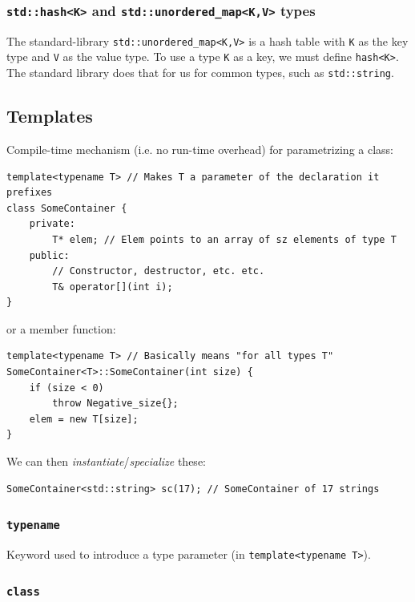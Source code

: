 \documentclass[table, xcdraw]{article}%
\begin{document}
\subsubsection{\texttt{std::hash<K>} and \texttt{std::unordered_map<K,V>} types}

The standard-library \texttt{std::unordered_map<K,V>} is a hash table with \texttt{K} as the key type and \texttt{V} as the value type. To use a type \texttt{K} as a key, we must define \texttt{hash<K>}. The standard library does that for us for common types, such as \texttt{std::string}.

\subsection{Templates}

Compile-time mechanism (i.e. no run-time overhead) for parametrizing a class:

\begin{verbatim}
template<typename T> // Makes T a parameter of the declaration it prefixes
class SomeContainer {
    private:
        T* elem; // Elem points to an array of sz elements of type T
    public:
        // Constructor, destructor, etc. etc.
        T& operator[](int i);
}
\end{verbatim}

or a member function:

\begin{verbatim}
template<typename T> // Basically means "for all types T"
SomeContainer<T>::SomeContainer(int size) {
    if (size < 0)
        throw Negative_size{};
    elem = new T[size];
}
\end{verbatim}

We can then \textit{instantiate}/\textit{specialize} these:

\begin{verbatim}
SomeContainer<std::string> sc(17); // SomeContainer of 17 strings
\end{verbatim}

\subsubsection{\texttt{typename}}

Keyword used to introduce a type parameter (in \texttt{template<typename T>}).

\subsubsection{\texttt{class}}
\end{document}
